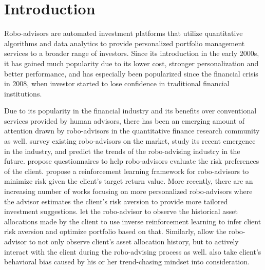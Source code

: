 \chapter{Introduction}

Robo-advisors are automated investment platforms that utilize quantitative algorithms and data analytics to provide personalized portfolio management services to a broader range of investors. Since its introduction in the early 2000s, it has gained much popularity due to its lower cost, stronger personalization and better performance, and has especially been popularized since the financial crisis in 2008, when investor started to lose confidence in traditional financial institutions.

Due to its popularity in the financial industry and its benefits over conventional services provided by human advisors, there has been an emerging amount of attention drawn by robo-advisors in the quantitative finance research community as well.  survey existing robo-advisors on the market, study its recent emergence in the industry, and predict the trends of the robo-advising industry in the future.  propose questionnaires to help robo-advisors evaluate the risk preferences of the client.  propose a reinforcement learning framework for robo-advisors to minimize risk given the client's target return value. More recently, there are an increasing number of works focusing on more personalized robo-advisors where the advisor estimates the client's risk aversion to provide more tailored investment suggestions.  let the robo-advisor to observe the historical asset allocations made by the client to use inverse reinforcement learning to infer client risk aversion and optimize portfolio based on that. Similarly,  allow the robo-advisor to not only observe client's asset allocation history, but to actively interact with the client during the robo-advising process as well.  also take client's behavioral bias caused by his or her trend-chasing mindset into consideration.

